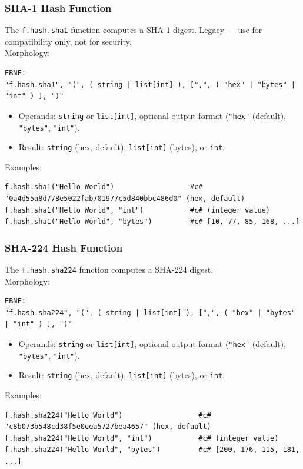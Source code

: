 \subsubsection{SHA-1 Hash Function}
The \texttt{f.hash.sha1} function computes a SHA-1 digest. Legacy --- use for compatibility only, not for security. \\
Morphology:
\begin{verbatim}
EBNF:
"f.hash.sha1", "(", ( string | list[int] ), [",", ( "hex" | "bytes" | "int" ) ], ")"
\end{verbatim}
\begin{itemize}
\item Operands: \texttt{string} or \texttt{list[int]}, optional output format (\texttt{"hex"} (default), \texttt{"bytes"}, \texttt{"int"}).
\item Result: \texttt{string} (hex, default), \texttt{list[int]} (bytes), or \texttt{int}.
\end{itemize}
Examples:
\begin{verbatim}
f.hash.sha1("Hello World")                  #c# "0a4d55a8d778e5022fab701977c5d840bbc486d0" (hex, default)
f.hash.sha1("Hello World", "int")           #c# (integer value)
f.hash.sha1("Hello World", "bytes")         #c# [10, 77, 85, 168, ...]
\end{verbatim}

\subsubsection{SHA-224 Hash Function}
The \texttt{f.hash.sha224} function computes a SHA-224 digest. \\
Morphology:
\begin{verbatim}
EBNF:
"f.hash.sha224", "(", ( string | list[int] ), [",", ( "hex" | "bytes" | "int" ) ], ")"
\end{verbatim}
\begin{itemize}
\item Operands: \texttt{string} or \texttt{list[int]}, optional output format (\texttt{"hex"} (default), \texttt{"bytes"}, \texttt{"int"}).
\item Result: \texttt{string} (hex, default), \texttt{list[int]} (bytes), or \texttt{int}.
\end{itemize}
Examples:
\begin{verbatim}
f.hash.sha224("Hello World")                  #c# "c8b073b548cd38f5e0eea5727bea4657" (hex, default)
f.hash.sha224("Hello World", "int")           #c# (integer value)
f.hash.sha224("Hello World", "bytes")         #c# [200, 176, 115, 181, ...]
\end{verbatim}

